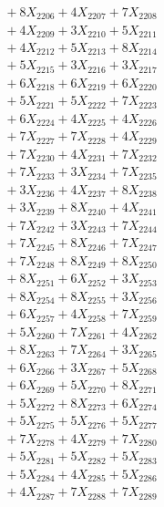 \documentclass[a4paper,10pt]{article}
\begin{document}
{\begin{align}
&\;  + 8 X_{2206} + 4 X_{2207} + 7 X_{2208} \\[0.3ex]
&\;  + 4 X_{2209} + 3 X_{2210} + 5 X_{2211} \\[0.3ex]
&\;  + 4 X_{2212} + 5 X_{2213} + 8 X_{2214} \\[0.3ex]
&\;  + 5 X_{2215} + 3 X_{2216} + 3 X_{2217} \\[0.3ex]
&\;  + 6 X_{2218} + 6 X_{2219} + 6 X_{2220} \\[0.3ex]
&\;  + 5 X_{2221} + 5 X_{2222} + 7 X_{2223} \\[0.3ex]
&\;  + 6 X_{2224} + 4 X_{2225} + 4 X_{2226} \\[0.3ex]
&\;  + 7 X_{2227} + 7 X_{2228} + 4 X_{2229} \\[0.5ex]\allowbreak
&\;  + 7 X_{2230} + 4 X_{2231} + 7 X_{2232} \\[0.3ex]
&\;  + 7 X_{2233} + 3 X_{2234} + 7 X_{2235} \\[0.3ex]
&\;  + 3 X_{2236} + 4 X_{2237} + 8 X_{2238} \\[0.3ex]
&\;  + 3 X_{2239} + 8 X_{2240} + 4 X_{2241} \\[0.3ex]
&\;  + 7 X_{2242} + 3 X_{2243} + 7 X_{2244} \\[0.3ex]
&\;  + 7 X_{2245} + 8 X_{2246} + 7 X_{2247} \\[0.3ex]
&\;  + 7 X_{2248} + 8 X_{2249} + 8 X_{2250} \\[0.3ex]
&\;  + 8 X_{2251} + 6 X_{2252} + 3 X_{2253} \\[0.3ex]
&\;  + 8 X_{2254} + 8 X_{2255} + 3 X_{2256} \\[0.3ex]
&\;  + 6 X_{2257} + 4 X_{2258} + 7 X_{2259} \\[0.5ex]\allowbreak
&\;  + 5 X_{2260} + 7 X_{2261} + 4 X_{2262} \\[0.3ex]
&\;  + 8 X_{2263} + 7 X_{2264} + 3 X_{2265} \\[0.3ex]
&\;  + 6 X_{2266} + 3 X_{2267} + 5 X_{2268} \\[0.3ex]
&\;  + 6 X_{2269} + 5 X_{2270} + 8 X_{2271} \\[0.3ex]
&\;  + 5 X_{2272} + 8 X_{2273} + 6 X_{2274} \\[0.3ex]
&\;  + 5 X_{2275} + 5 X_{2276} + 5 X_{2277} \\[0.3ex]
&\;  + 7 X_{2278} + 4 X_{2279} + 7 X_{2280} \\[0.3ex]
&\;  + 5 X_{2281} + 5 X_{2282} + 5 X_{2283} \\[0.3ex]
&\;  + 5 X_{2284} + 4 X_{2285} + 5 X_{2286} \\[0.3ex]
&\;  + 4 X_{2287} + 7 X_{2288} + 7 X_{2289} \\[0.5ex]\allowbreak

\end{align}}
\end{document}
